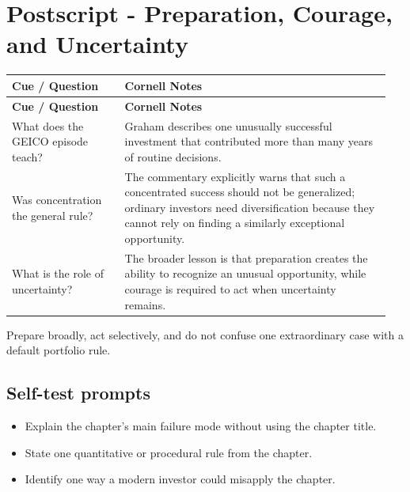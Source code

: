 \documentclass[11pt]{article}
\begin{document}
\section{Postscript - Preparation, Courage, and Uncertainty}
\begin{longtable}{@{}>{\raggedright\arraybackslash}p{0.29\linewidth}>{\raggedright\arraybackslash}p{0.66\linewidth}@{}}\toprule\textbf{Cue / Question} & \textbf{Cornell Notes}\\\midrule\endfirsthead\toprule\textbf{Cue / Question} & \textbf{Cornell Notes}\\\midrule\endhead
What does the GEICO episode teach? & Graham describes one unusually successful investment that contributed more than many years of routine decisions. \\
Was concentration the general rule? & The commentary explicitly warns that such a concentrated success should not be generalized; ordinary investors need diversification because they cannot rely on finding a similarly exceptional opportunity. \\
What is the role of uncertainty? & The broader lesson is that preparation creates the ability to recognize an unusual opportunity, while courage is required to act when uncertainty remains. \\
\bottomrule\end{longtable}
\begin{principlebox}Prepare broadly, act selectively, and do not confuse one extraordinary case with a default portfolio rule.\end{principlebox}
\subsection*{Self-test prompts}\begin{itemize}\item Explain the chapter's main failure mode without using the chapter title.\item State one quantitative or procedural rule from the chapter.\item Identify one way a modern investor could misapply the chapter.\end{itemize}
\end{document}
